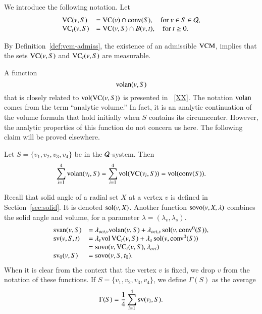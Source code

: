 \begin{definition}  We introduce the following notation.  Let
    $$
    \begin{array}{lll}
        {\operatorname{VC}}(v,S) &= {\operatorname{VC}}(v)\cap {\operatorname{conv}}(S),\quad \text{for } v\in
        S\in{\mathcal Q},\\
        {\operatorname{VC}}_t(v,S) &= {\operatorname{VC}}(v,S)\cap B(v,t),\quad\text{for } t\ge
        0.
    \end{array}
    $$
\end{definition}

By Definition~\ref{def:vcm-admiss}, the existence of an admissible
${\operatorname{VCM}}$, implies that the sets ${\operatorname{VC}}(v,S)$ and
${\operatorname{VC}}_t(v,S)$ are measurable.  



A function
    $$
    {\operatorname{volan}}(v,S)
    $$ that is closely related to ${\operatorname{vol}}({\operatorname{VC}}(v,S))$ is presented in
\Chap~\ref{XX}.  The notation ${\operatorname{volan}}$
comes from the term ``analytic volume.''  In fact, it is an
analytic continuation of the volume formula that hold initially
when $S$ contains its circumcenter.  However, the analytic
properties of this function do not concern us here.  The following
claim will be proved elsewhere.

\begin{claim}\label{claim:volan} Let $S=\{v_1,v_2,v_3,v_4\}$ be in
the ${\mathcal Q}$-system. Then
    $$
    \sum_{i=1}^4 {\operatorname{volan}}(v_i,S) = \sum_{i=1}^4
    {\operatorname{vol}}({\operatorname{VC}}(v_i,S)) = {\operatorname{vol}}({\operatorname{conv}}(S)).
    $$
\end{claim}



\begin{definition}\label{def:svor}
Recall that solid angle of a radial set $X$ at a vertex $v$ is defined in
Section~\ref{sec:solid}.  It is denoted $\operatorname{sol}(v,X)$.
Another function ${\operatorname{sovo}}(v,X,\lambda)$ combines the solid
angle and volume, for a parameter $\lambda=(\lambda_v,\lambda_s)$.
%
      $$
      \begin{array}{lll}
      {\operatorname{svan}}(v,S) &= \lambda_{oct,v} {\operatorname{volan}}(v,S)
         +\lambda_{oct,s}\operatorname{sol}(v,{\operatorname{conv}}^0(S)),\\
      {\operatorname{sv}}(v,S,t) &= \lambda_v {\operatorname{vol}}\,{\operatorname{VC}}_{t}(v,S)
         +\lambda_s\operatorname{sol}(v,{\operatorname{conv}}^0(S))\\
          &= {\operatorname{sovo}}(v,{\operatorname{VC}}_t(v,S),\lambda_{oct})\\
            {\operatorname{sv}}_0(v,S) &= {\operatorname{sovo}}(v,S,t_0).
      \end{array}$$
When it is clear from the context that the vertex $v$ is
fixed, we drop $v$ from the notation of these
functions.
   If $S=\{v_1,v_2,v_3,v_4\}$, we define $\Gamma(S)$ as the average
   \begin{equation}
   \Gamma(S) = \frac{1}{4}\sum_{i=1}^4{\operatorname{sv}}(v_i,S).
   \label{eqn:gamma}
   \end{equation}
%
\end{definition}

